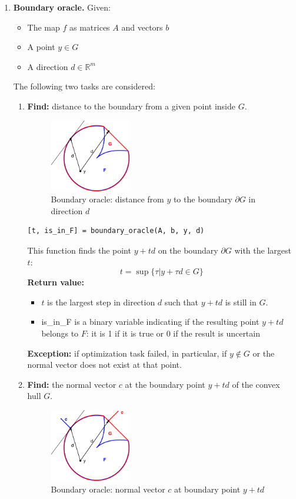 \documentclass[a4paper]{article}
\newcommand{\R}{\mathbb{R}}
\theoremstyle{definition}
\begin{document}
\begin{enumerate}
\item {\bf Boundary oracle.} Given:
\begin{itemize}
	\item The map $f$ as matrices $A$ and vectors $b$
	\item A point $y\in G$
	\item A direction $d\in\R^m$
\end{itemize}
The following two tasks are considered:
\begin{enumerate}
\item {\bf Find:} distance to the boundary from a given point inside $G$.

\begin{figure}[H]
	\centering\includegraphics[width=100pt]{fig/boundary_oracle}
	\caption{Boundary oracle: distance from $y$ to the boundary $\partial G$ in direction $d$}
\end{figure}

\begin{verbatim}
[t, is_in_F] = boundary_oracle(A, b, y, d)
\end{verbatim}

This function finds the point $y+td$ on the boundary $\partial G$ with the largest $t$:
$$t = \sup\{\tau\big| y+\tau d\in G\}$$
{\bf Return value:}
\begin{itemize}
	\item $t$ is the largest step in direction $d$ such that $y+td$ is still in $G$.
	\item is\_in\_F is a binary variable indicating if the resulting point $y+td$ belongs to $F$: it is 1 if it is true or 0 if the result is uncertain
\end{itemize}

{\bf Exception:} if optimization task failed, in particular, if $y\notin G$ or the normal vector does not exist at that point.

\item {\bf Find:} the normal vector $c$ at the boundary point $y+td$ of the convex hull $G$.

\begin{figure}[H]
	\centering\includegraphics[width=100pt]{fig/get_c_from_d}
	\caption{Boundary oracle: normal vector $c$ at boundary point $y+td$}
\end{figure}


\end{enumerate}
\end{enumerate}
\end{document}
